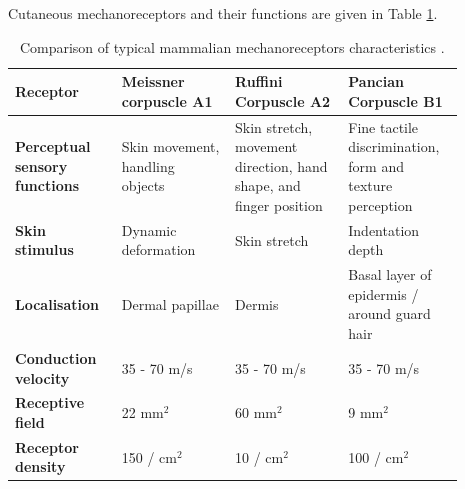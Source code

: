 Cutaneous mechanoreceptors and their functions are given in Table \ref{tab:mechanoreceptors-table}.
\begin{table}[H]
    \centering
	\caption{Comparison of typical mammalian mechanoreceptors characteristics \cite{Roudaut2012}.}
	\label{tab:mechanoreceptors-table}
	\begin{tabular}{|p{0.2\linewidth}|p{0.23\linewidth}|p{0.23\linewidth}|p{0.23\linewidth}|} \hline
		\textbf{Receptor} & Meissner corpuscle A1 & Ruffini Corpuscle A2 & Pancian Corpuscle B1 \\ \hline
		\textbf{Perceptual   sensory functions} & Skin movement, handling objects & Skin stretch, movement direction,   hand shape, and finger position & Fine tactile discrimination, form   and texture perception \\ \hline
		\textbf{Skin stimulus} & Dynamic deformation & Skin stretch & Indentation depth \\ \hline
		\textbf{Localisation} & Dermal papillae & Dermis & Basal layer of epidermis / around   guard hair \\ \hline
		\textbf{Conduction velocity} & 35 - 70 m/s & 35 - 70 m/s & 35 - 70 m/s  \\ \hline
		\textbf{Receptive field} & 22 mm$^2$ & 60 mm$^2$ & 9 mm$^2$ \\ \hline
		\textbf{Receptor density} & 150 / cm$^2$ & 10 / cm$^2$ & 100 / cm$^2$ \\ \hline
	\end{tabular}
\end{table}


